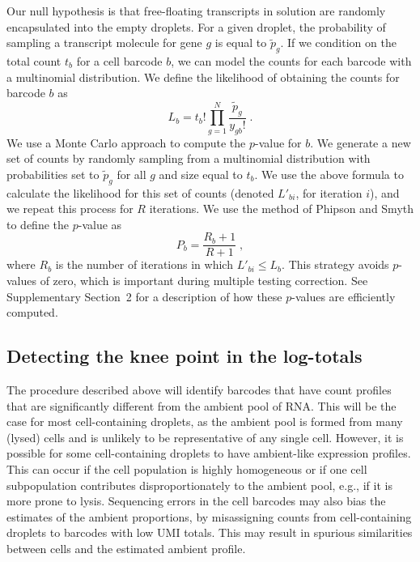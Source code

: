 \documentclass[10pt,letterpaper]{article}
\newcommand{\suppsecmontecarlo}{2}
\begin{document}
Our null hypothesis is that free-floating transcripts in solution are randomly encapsulated into the empty droplets.
For a given droplet, the probability of sampling a transcript molecule for gene $g$ is equal to $\tilde{p}_g$.
If we condition on the total count $t_b$ for a cell barcode $b$, we can model the counts for each barcode with a multinomial distribution.
We define the likelihood of obtaining the counts for barcode $b$ as 
\[
    L_b = t_b! \prod_{g=1}^N \frac{\tilde{p}_g}{y_{gb}!} \;.
\]
We use a Monte Carlo approach to compute the $p$-value for $b$.
We generate a new set of counts by randomly sampling from a multinomial distribution with probabilities set to $\tilde{p}_g$ for all $g$ and size equal to $t_b$.
We use the above formula to calculate the likelihood for this set of counts (denoted $L'_{bi}$, for iteration $i$), and we repeat this process for $R$ iterations. 
We use the method of Phipson and Smyth \cite{phipson2010permutation} to define the $p$-value as 
\[
    P_b = \frac{R_b +1 }{R + 1} \;,
\]
where $R_b$ is the number of iterations in which $L'_{bi} \le L_b$.
This strategy avoids $p$-values of zero, which is important during multiple testing correction.
See Supplementary Section~\suppsecmontecarlo{} for a description of how these $p$-values are efficiently computed.

\subsection*{Detecting the knee point in the log-totals}
The procedure described above will identify barcodes that have count profiles that are significantly different from the ambient pool of RNA.
This will be the case for most cell-containing droplets, as the ambient pool is formed from many (lysed) cells and is unlikely to be representative of any single cell.
However, it is possible for some cell-containing droplets to have ambient-like expression profiles.
This can occur if the cell population is highly homogeneous or if one cell subpopulation contributes disproportionately to the ambient pool, e.g., if it is more prone to lysis.
Sequencing errors in the cell barcodes may also bias the estimates of the ambient proportions, by misassigning counts from cell-containing droplets to barcodes with low UMI totals.
This may result in spurious similarities between cells and the estimated ambient profile.
\end{document}
